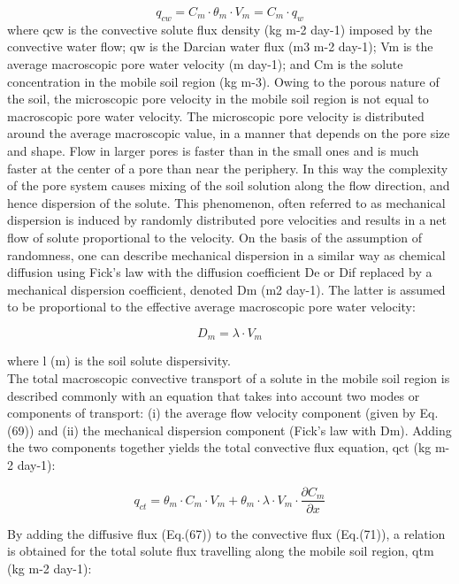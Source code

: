 \begin{equation}
q_{cw} = C_m \cdot \theta_m \cdot V_m = C_m \cdot q_w
\end{equation}
where qcw is the convective solute flux density (kg m-2 day-1) imposed by the convective water flow; qw is the Darcian water flux (m3 m-2 day-1); Vm is the average macroscopic pore water velocity (m day-1); and Cm is the solute concentration in the mobile soil region (kg m-3). Owing to the porous nature of the soil, the microscopic pore velocity in the mobile soil region is not equal to macroscopic pore water velocity. The microscopic pore velocity is distributed around the average macroscopic value, in a manner that depends on the pore size and shape. Flow in larger pores is faster than in the small ones and is much faster at the center of a pore than near the periphery. In this way the complexity of the pore system causes mixing of the soil solution along the flow direction, and hence dispersion of the solute. This phenomenon, often referred to as mechanical dispersion is induced by randomly distributed pore velocities and results in a net flow of solute proportional to the velocity. On the basis of the assumption of randomness, one can describe mechanical dispersion in a similar way as chemical diffusion using Fick's law with the diffusion coefficient De or Dif replaced by a mechanical dispersion coefficient, denoted Dm (m2 day-1). The latter is assumed to be proportional to the effective average macroscopic pore water velocity:


\begin{equation}
D_m = \lambda \cdot V_m
\end{equation}

where l (m) is the soil solute dispersivity.
\\
The total macroscopic convective transport of a solute in the mobile soil region is described commonly with an equation that takes into account two modes or components of transport: (i) the average flow velocity component (given by Eq. (69)) and (ii) the mechanical dispersion component (Fick's law with Dm). Adding the two components together yields the total convective flux equation, qct (kg m-2 day-1):

\begin{equation}
q_{ct} = \theta_m \cdot C_m \cdot V_m + \theta_m \cdot \lambda \cdot V_m \cdot \frac{\partial C_m}{\partial x}
\end{equation}

By adding the diffusive flux (Eq.(67)) to the convective flux (Eq.(71)), a relation is obtained for the total solute flux travelling along the mobile soil region, qtm (kg m-2 day-1):

